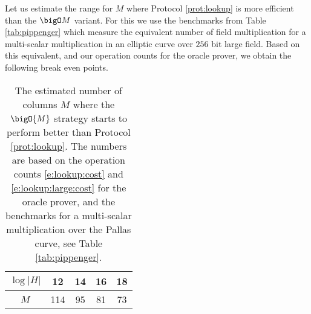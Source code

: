 \documentclass[11pt]{article}
\theoremstyle{definition}
\theoremstyle{remark}
\begin{document}
Let us estimate the range for $M$ where Protocol \ref{prot:lookup} is more efficient than the $\bigO M$ variant. 
For this we use the benchmarks from Table \ref{tab:pippenger} which measure the equivalent number of field multiplication for a multi-scalar multiplication in an elliptic curve over $256$ bit large field.
Based on this equivalent, and our operation counts for the oracle prover, we obtain the following break even points.
\begin{table}[h!]
\caption{%
The estimated number of columns $M$ where the $\bigO{M}$ strategy starts to perform better than Protocol \ref{prot:lookup}. 
The numbers are based on the operation counts \eqref{e:lookup:cost} and \eqref{e:lookup:large:cost} for the oracle prover, and the 
benchmarks for a multi-scalar multiplication over the Pallas curve, see Table \ref{tab:pippenger}.
}
\vspace*{0.5cm}
\centering
\begin{tabular} {|c|c|c|c|c|}
\hline
$\log|H|$ & 12 & 14 & 16 & 18
\\\hline
$M$ & 114 & 95 & 81 & 73
\\\hline
\end{tabular}
\end{table}



%
\end{document}

